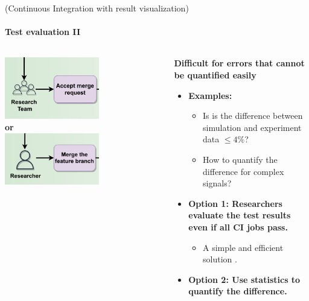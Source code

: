 \begin{frame}{(Continuous Integration with result visualization)} 
    \framesubtitle{Test evaluation II}

    \vfill

    \begin{columns}
        \begin{column}[c]{0.4\textwidth}
            \begin{center}
            \includegraphics[width=0.6\textwidth]{figures/researchteam-test-evaluation.png}\\
            \textbf{or}\\
            \includegraphics[width=0.6\textwidth]{figures/researcher-test-evaluation.png}
            \end{center}
        \end{column}
        \begin{column}[c]{0.6\textwidth}
            \textbf{Difficult for errors that cannot be quantified easily}
            \begin{itemize}
                \item \textbf{Examples:} 
                    \begin{itemize}
                        \item Is is the difference between simulation and experiment data $\le 4\%$? 
                        \item How to quantify the difference for complex signals?
                    \end{itemize}
                \item \textbf{Option 1: Researchers evaluate the test results even if all CI jobs pass.}
                    \begin{itemize}
                        \item A simple and efficient solution \faGraduationCap.
                    \end{itemize}
                \item \textbf{Option 2: Use statistics to quantify the difference.}


\end{itemize}
\end{column}
\end{columns}
\end{frame}
